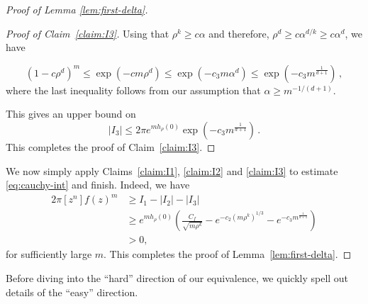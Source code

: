\documentclass{daj}
\theoremstyle{definition}
\theoremstyle{remark}
\begin{document}
\begin{proof}[Proof of Lemma \ref{lem:first-delta}]
\begin{proof}[Proof of Claim~\ref{claim:I3}]
	Using that $\rho^k \geq c\alpha$ and therefore, $\rho^d \geq c\alpha^{d/k} \geq c\alpha^{d}$, we have
	
	$$(1 - c \rho^d)^m \leq \exp\left(- c m\rho^d \right) \leq \exp\left(- c_3 m \alpha^d \right) \leq \exp\left(- c_3 m^{\frac{1}{d+1}} \right)\,, $$
	where the last inequality follows from our assumption that $\alpha \geq m^{-1/(d+1)}$.
	
	This gives an upper bound on $$|I_3| \leq 2\pi e^{m h_\rho(0)} \exp\left(-c_3 m^{\frac{1}{d+1}} \right)\,.$$ This completes the proof of Claim~\ref{claim:I3}.
\end{proof}
	
\vspace{4mm}

We now simply apply Claims~\ref{claim:I1}, \ref{claim:I2} and \ref{claim:I3} to estimate \eqref{eq:cauchy-int} and finish. Indeed, we have \begin{align*} 2\pi [z^n]f(z)^m &\geq I_1 - |I_2| - |I_3| \\
	&\geq e^{m h_\rho(0)} \left(\frac{C_f}{\sqrt{m\rho^k}}  - e^{-c_2(m\rho^k)^{1/3}} -  e^{-c_3 m^{\frac{1}{d+1}}} \right) \\
	&> 0, \end{align*} for sufficiently large $m$. This completes the proof of Lemma~\ref{lem:first-delta}.\end{proof}


\vspace{4mm}

Before diving into the ``hard'' direction of our equivalence, we quickly spell out details of the ``easy'' direction.
\end{document}
